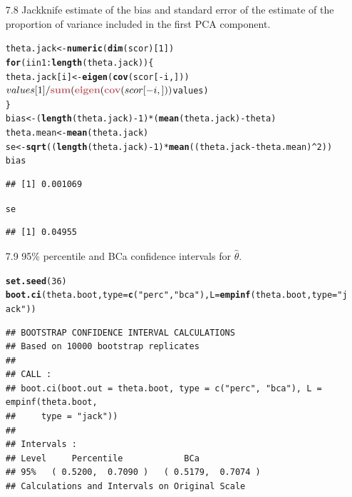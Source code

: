 \documentclass{article}\usepackage[]{graphicx}\usepackage[]{color}
\makeatletter
\newcommand{\hlstr}[1]{\textcolor[rgb]{0.192,0.494,0.8}{#1}}%
\newcommand{\hlkwd}[1]{\textcolor[rgb]{0.737,0.353,0.396}{\textbf{#1}}}%
\newenvironment{kframe}{%
 \def\at@end@of@kframe{}%
 \ifinner\ifhmode%
  \def\at@end@of@kframe{\end{minipage}}%
  \begin{minipage}{\columnwidth}%
 \fi\fi%
 \def\FrameCommand##1{\hskip\@totalleftmargin \hskip-\fboxsep
 \colorbox{shadecolor}{##1}\hskip-\fboxsep
     \hskip-\linewidth \hskip-\@totalleftmargin \hskip\columnwidth}%
 \MakeFramed {\advance\hsize-\width
   \@totalleftmargin\z@ \linewidth\hsize
   \@setminipage}}%
 {\par\unskip\endMakeFramed%
 \at@end@of@kframe}
\newenvironment{knitrout}{}{} %
\makeatother
\begin{document}
\begin{itemize}
\item[7.8] Jackknife estimate of the bias and standard error of the estimate of the proportion of variance included in the first PCA component.\\
\begin{knitrout}
\color{fgcolor}\begin{kframe}
\begin{alltt}
theta.jack <- \hlkwd{numeric}(\hlkwd{dim}(scor)[1])
\hlkwd{for} (i in 1:\hlkwd{length}(theta.jack)) \{
    theta.jack[i] <- \hlkwd{eigen}(\hlkwd{cov}(scor[-i, ]))$values[1]/\hlkwd{sum}(\hlkwd{eigen}(\hlkwd{cov}(scor[-i, 
        ]))$values)
\}
bias <- (\hlkwd{length}(theta.jack) - 1) * (\hlkwd{mean}(theta.jack) - theta)
theta.mean <- \hlkwd{mean}(theta.jack)
se <- \hlkwd{sqrt}((\hlkwd{length}(theta.jack) - 1) * \hlkwd{mean}((theta.jack - theta.mean)^2))
bias
\end{alltt}
\begin{verbatim}
## [1] 0.001069
\end{verbatim}
\begin{alltt}
se
\end{alltt}
\begin{verbatim}
## [1] 0.04955
\end{verbatim}
\end{kframe}
\end{knitrout}


\item[7.9] 95\% percentile and BCa confidence intervals for $\hat{\theta}$.\\
\begin{knitrout}
\color{fgcolor}\begin{kframe}
\begin{alltt}
\hlkwd{set.seed}(36)
\hlkwd{boot.ci}(theta.boot, type = \hlkwd{c}(\hlstr{"perc"}, \hlstr{"bca"}), L = \hlkwd{empinf}(theta.boot, type = \hlstr{"jack"}))
\end{alltt}
\begin{verbatim}
## BOOTSTRAP CONFIDENCE INTERVAL CALCULATIONS
## Based on 10000 bootstrap replicates
## 
## CALL : 
## boot.ci(boot.out = theta.boot, type = c("perc", "bca"), L = empinf(theta.boot, 
##     type = "jack"))
## 
## Intervals : 
## Level     Percentile            BCa          
## 95%   ( 0.5200,  0.7090 )   ( 0.5179,  0.7074 )  
## Calculations and Intervals on Original Scale
\end{verbatim}
\end{kframe}
\end{knitrout}



\end{itemize}
\end{document}
